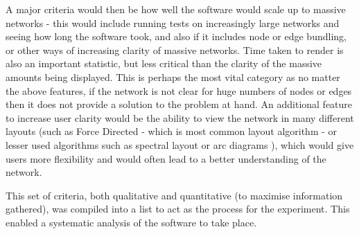 \documentclass[../dissertation.tex]{subfiles}
\begin{document}
A major criteria would then be how well the software would scale up to massive networks - this would include running tests on increasingly large networks and seeing how long the software took, and also if it includes node or edge bundling, or other ways of increasing clarity of massive networks. Time taken to render is also an important statistic, but less critical than the clarity of the massive amounts being displayed. This is perhaps the most vital category as no matter the above features, if the network is not clear for huge numbers of nodes or edges then it does not provide a solution to the problem at hand. An additional feature to increase user clarity would be the ability to view the network in many different layouts (such as Force Directed \cite{fruchterman1991graph} - which is most common layout algorithm - or lesser used algorithms such as spectral layout \cite{beckman1994theory} or arc diagrams \cite{didimo2013graph}), which would give users more flexibility and would often lead to a better understanding of the network. 

This set of criteria, both qualitative and quantitative (to maximise information gathered), was compiled into a list to act as the process for the experiment. This enabled a systematic analysis of the software to take place.
\end{document}
